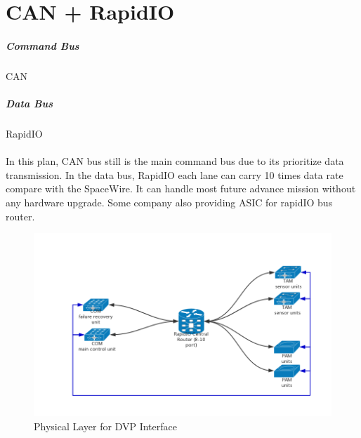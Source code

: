 \documentclass[12pt,article]{memoir}
\begin{document}
\section{CAN + RapidIO}
\subparagraph{Command Bus}CAN
\subparagraph{Data Bus}RapidIO\\\\
In this plan, CAN bus still is the main command bus due to its prioritize data transmission. In the data bus, RapidIO each lane can carry 10 times data rate compare with the SpaceWire. It can handle most future advance mission without any hardware upgrade. Some company also providing ASIC for rapidIO bus router.
\begin{figure}[htp]
\includegraphics[width=\textwidth]{DR00001_RapidIO.png}
 \caption{Physical Layer for DVP Interface}	
\end{figure}
\newpage
\end{document}
